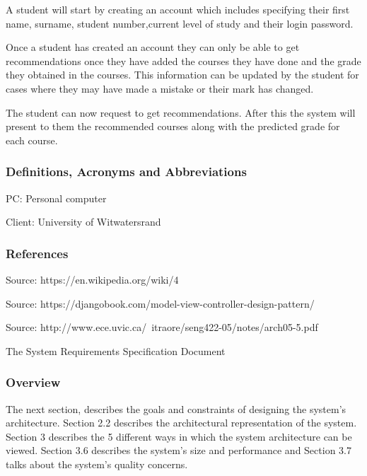 \documentclass[10pt]{article}
\begin{document}
A student will start by creating an account which includes specifying their first name, surname, student number,current level of study and their login password.

Once a student has created an account they can only be able to get recommendations once they have added the courses they have done and the grade they obtained in the courses. This information can be updated by the student for cases where they may have made a mistake or their mark has changed.

The student can now request to get recommendations. After this the system will present to them the recommended courses along with the predicted grade for each course.

\subsubsection{Definitions, Acronyms and Abbreviations}

PC:  Personal computer

Client: University of Witwatersrand

\subsubsection{References}

\begin{description}[font=$\bullet$~\normalfont\scshape\color{red!50!black}]
\item [] Source: https://en.wikipedia.org/wiki/4%
\item [] Source: https://djangobook.com/model-view-controller-design-pattern/
\item [] Source: http://www.ece.uvic.ca/~itraore/seng422-05/notes/arch05-5.pdf
\item [] The System Requirements Specification Document

\end{description}


\subsubsection{Overview}

The next section, describes the goals and constraints of designing the system’s architecture. Section 2.2 describes the architectural representation of the system. Section 3 describes the 5 different ways in which the system architecture can be viewed. Section 3.6 describes the system’s size and performance and Section 3.7 talks about the system’s quality concerns.
\end{document}
